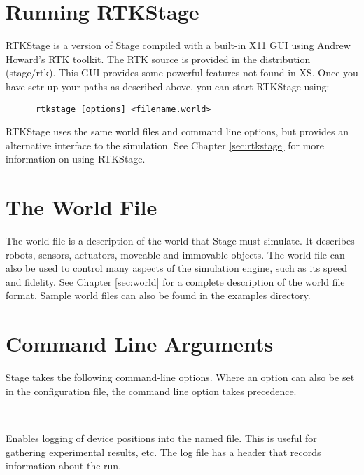 \documentclass[11pt]{report}
\newenvironment{xarg}[1]{\noindent{\tt #1}\\\hspace*{2em}\begin{minipage}[t]{5in}}{\end{minipage}\vspace*{1em}}
\begin{document}
  
  \section{Running RTKStage}

    RTKStage is a version of Stage compiled with a built-in X11 GUI
    using Andrew Howard's RTK toolkit. The RTK source is provided in
    the distribution (stage/rtk). This GUI provides some powerful
    features not found in XS.  Once you have setr up your paths
    as described above, you can start RTKStage using:
      \begin{verbatim} 
      rtkstage [options] <filename.world> 
      \end{verbatim} 
    RTKStage uses the same world files and command line options,
    but provides an alternative interface to the simulation.
    See Chapter \ref{sec:rtkstage} for more information on using
    RTKStage.

  \section{The World File}

    The world file is a description of the world that Stage
    must simulate.  It describes robots, sensors, actuators,
    moveable and immovable objects.  The world file can also
    be used to control many aspects of the simulation engine,
    such as its speed and fidelity.  
    See Chapter \ref{sec:world} for a complete description of
    the world file format.  Sample world files can also be
    found in the examples directory.

  \section{Command Line Arguments}

    Stage takes the following command-line options. Where an option
    can also be set in the configuration file, the command line option
    takes precedence.

    \begin{xarg}{-l <logfile>}
    Enables logging of device positions into the named file. This is
    useful for gathering experimental results, etc. The log file has a
    header that records information about the run.
    \end{xarg}
\end{document}
